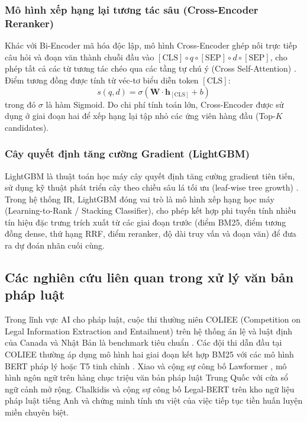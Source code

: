 \documentclass[12pt,a4paper]{article}
\begin{document}
\subsubsection{Mô hình xếp hạng lại tương tác sâu (Cross-Encoder Reranker)}
Khác với Bi-Encoder mã hóa độc lập, mô hình Cross-Encoder ghép nối trực tiếp câu hỏi và đoạn văn thành chuỗi đầu vào $[\text{CLS}] \circ q \circ [\text{SEP}] \circ d \circ [\text{SEP}]$, cho phép tất cả các từ tương tác chéo qua các tầng tự chú ý (Cross Self-Attention) \cite{nogueira2019passage}. Điểm tương đồng được tính từ véc-tơ biểu diễn token $[\text{CLS}]$:
\begin{equation}
s(q, d) = \sigma(\mathbf{W} \cdot \mathbf{h}_{[\text{CLS}]} + b)
\label{eq:cross_encoder}
\end{equation}
trong đó $\sigma$ là hàm Sigmoid. Do chi phí tính toán lớn, Cross-Encoder được sử dụng ở giai đoạn hai để xếp hạng lại tập nhỏ các ứng viên hàng đầu (Top-$K$ candidates).

\subsubsection{Cây quyết định tăng cường Gradient (LightGBM)}
LightGBM là thuật toán học máy cây quyết định tăng cường gradient tiên tiến, sử dụng kỹ thuật phát triển cây theo chiều sâu lá tối ưu (leaf-wise tree growth) \cite{ke2017lightgbm}. Trong hệ thống IR, LightGBM đóng vai trò là mô hình xếp hạng học máy (Learning-to-Rank / Stacking Classifier), cho phép kết hợp phi tuyến tính nhiều tín hiệu đặc trưng trích xuất từ các giai đoạn trước (điểm BM25, điểm tương đồng dense, thứ hạng RRF, điểm reranker, độ dài truy vấn và đoạn văn) để đưa ra dự đoán nhãn cuối cùng.

\subsection{Các nghiên cứu liên quan trong xử lý văn bản pháp luật}
Trong lĩnh vực AI cho pháp luật, cuộc thi thường niên COLIEE (Competition on Legal Information Extraction and Entailment) trên hệ thống án lệ và luật định của Canada và Nhật Bản là benchmark tiêu chuẩn \cite{kim2023coliee}. Các đội thi dẫn đầu tại COLIEE thường áp dụng mô hình hai giai đoạn kết hợp BM25 với các mô hình BERT pháp lý hoặc T5 tinh chỉnh \cite{yoshioka2021bert}. Xiao và cộng sự công bố Lawformer \cite{xiao2021lawformer}, mô hình ngôn ngữ trên hàng chục triệu văn bản pháp luật Trung Quốc với cửa sổ ngữ cảnh mở rộng. Chalkidis và cộng sự công bố Legal-BERT \cite{chalkidis2020legal} trên kho ngữ liệu pháp luật tiếng Anh và chứng minh tính ưu việt của việc tiếp tục tiền huấn luyện miền chuyên biệt.
\end{document}
